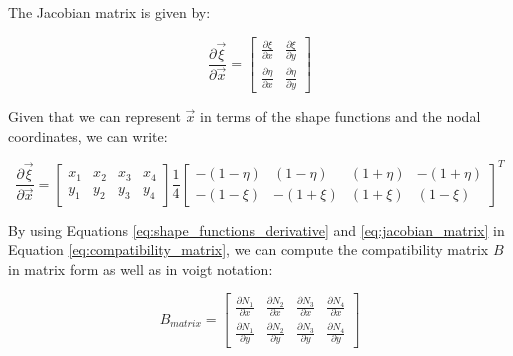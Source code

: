 The Jacobian matrix is given by:

\begin{equation}
    \frac{\partial \vec{\xi}}{\partial \vec{x}} = \begin{bmatrix}
        \frac{\partial \xi}{\partial x}  & \frac{\partial \xi}{\partial y}  \\
        \frac{\partial \eta}{\partial x} & \frac{\partial \eta}{\partial y}
    \end{bmatrix}
\end{equation}

Given that we can represent $\vec{x}$ in terms of the shape functions and the nodal coordinates, we can write:

\begin{equation}
    \frac{\partial \vec{\xi}}{\partial \vec{x}} = \begin{bmatrix}
        x_1 & x_2 & x_3 & x_4 \\
        y_1 & y_2 & y_3 & y_4
    \end{bmatrix} \frac{1}{4} \begin{bmatrix}
        - (1 - \eta) & (1 - \eta)  & (1 + \eta) & - (1 + \eta) \\
        - (1 - \xi)  & - (1 + \xi) & (1 + \xi)  & (1 - \xi)
    \end{bmatrix}^T
    \label{eq:jacobian_matrix}
\end{equation}

By using Equations \ref{eq:shape_functions_derivative} and \ref{eq:jacobian_matrix} in Equation \ref{eq:compatibility_matrix}, we can compute the compatibility matrix $B$ in matrix form as well as in voigt notation:

\begin{equation}
    B_{matrix} = \begin{bmatrix}
        \frac{\partial N_1}{\partial x} & \frac{\partial N_2}{\partial x} & \frac{\partial N_3}{\partial x} & \frac{\partial N_4}{\partial x} \\
        \frac{\partial N_1}{\partial y} & \frac{\partial N_2}{\partial y} & \frac{\partial N_3}{\partial y} & \frac{\partial N_4}{\partial y}
    \end{bmatrix}
\end{equation}

